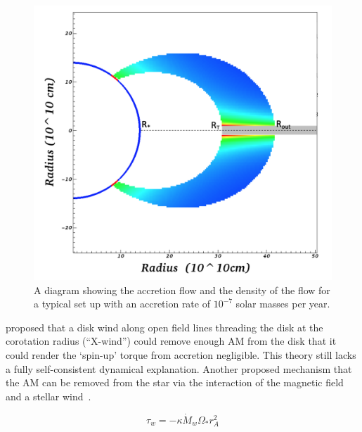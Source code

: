\documentclass[fleqn,usenatbib]{mnras}
\begin{document}
\begin{figure}
    \centering
    \includegraphics[width=\linewidth]{figures/Accretion}
    \caption{A diagram showing the accretion flow and the density of the flow for a typical set up with an accretion rate of $10^{-7}$ solar masses per year.}
    \label{fig:accretionflow}
\end{figure}

\citep{Shu:tw} proposed that a disk wind along open field lines threading the disk at the corotation radius (``X-wind'') could remove enough AM from the disk that it could render the `spin-up' torque from accretion negligible. This theory still lacks a fully self-consistent dynamical explanation. Another proposed mechanism that the AM can be removed from the star via the interaction of the magnetic field and a stellar wind~\citep[e.g.][]{2005ApJ...632L.135M,Matt:2008bj}. 

\begin{equation}
    \tau_{w} = -\kappa \dot{M}_{w} \Omega_{\ast} r_A^2
    \label{eq:wind_torque}
\end{equation}
\end{document}
